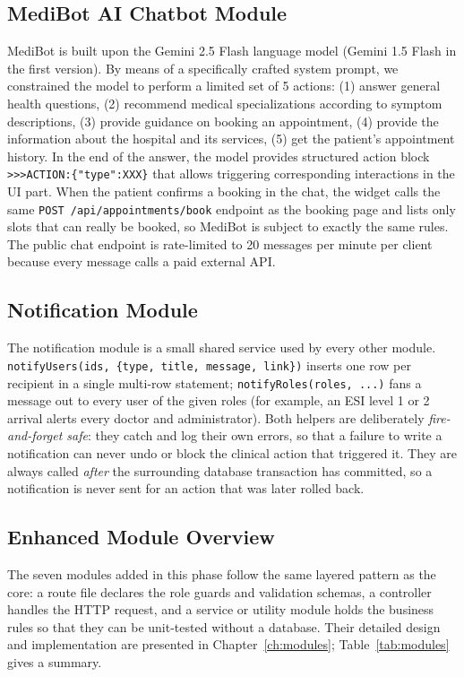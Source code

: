 \subsection{MediBot AI Chatbot Module}

MediBot is built upon the Gemini 2.5 Flash language model \cite{geminidocs} (Gemini 1.5 Flash in the first version). By means of a specifically crafted system prompt, we constrained the model to perform a limited set of 5 actions: (1) answer general health questions, (2) recommend medical specializations according to symptom descriptions, (3) provide guidance on booking an appointment, (4) provide the information about the hospital and its services, (5) get the patient's appointment history. In the end of the answer, the model provides structured action block \texttt{>>>ACTION:\{"type":XXX\}} that allows triggering corresponding interactions in the UI part. When the patient confirms a booking in the chat, the widget calls the same \texttt{POST /api/appointments/book} endpoint as the booking page and lists only slots that can really be booked, so MediBot is subject to exactly the same rules. The public chat endpoint is rate-limited to 20 messages per minute per client because every message calls a paid external API.

\subsection{Notification Module}

The notification module is a small shared service used by every other module. \texttt{notifyUsers(ids, \{type, title, message, link\})} inserts one row per recipient in a single multi-row statement; \texttt{notifyRoles(roles, ...)} fans a message out to every user of the given roles (for example, an ESI level 1 or 2 arrival alerts every doctor and administrator). Both helpers are deliberately \emph{fire-and-forget safe}: they catch and log their own errors, so that a failure to write a notification can never undo or block the clinical action that triggered it. They are always called \emph{after} the surrounding database transaction has committed, so a notification is never sent for an action that was later rolled back.

\subsection{Enhanced Module Overview}

The seven modules added in this phase follow the same layered pattern as the core: a route file declares the role guards and validation schemas, a controller handles the HTTP request, and a service or utility module holds the business rules so that they can be unit-tested without a database. Their detailed design and implementation are presented in Chapter~\ref{ch:modules}; Table~\ref{tab:modules} gives a summary.

